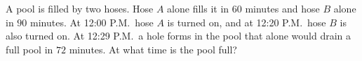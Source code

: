 A pool is filled by two hoses. Hose $A$ alone fills it in $60$ minutes and hose $B$ alone in $90$ minutes. At 12:00 P.M.\ hose $A$ is turned on, and at 12:20 P.M.\ hose $B$ is also turned on. At 12:29 P.M.\ a hole forms in the pool that alone would drain a full pool in $72$ minutes. At what time is the pool full?
